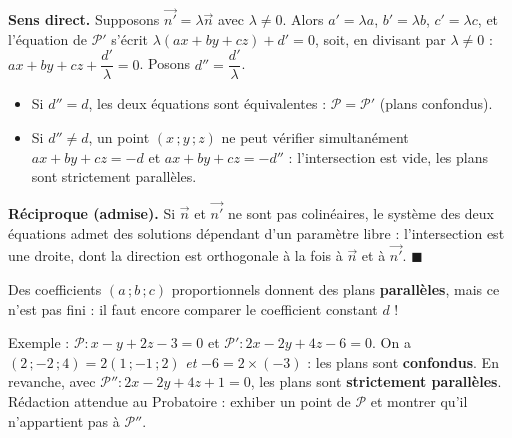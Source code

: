 \documentclass[11pt]{article}
\begin{document}
\begin{experience}
\textbf{Sens direct.} Supposons $\vec{n'} = \lambda \vec{n}$ avec $\lambda \neq 0$. Alors $a' = \lambda a$, $b' = \lambda b$, $c' = \lambda c$, et l'équation de $\mathcal{P}'$ s'écrit $\lambda(ax + by + cz) + d' = 0$, soit, en divisant par $\lambda \neq 0$ : $ax + by + cz + \dfrac{d'}{\lambda} = 0$. Posons $d'' = \dfrac{d'}{\lambda}$.
\begin{itemize}
\item Si $d'' = d$, les deux équations sont équivalentes : $\mathcal{P} = \mathcal{P}'$ (plans confondus).
\item Si $d'' \neq d$, un point $(x\,;y\,;z)$ ne peut vérifier simultanément $ax + by + cz = -d$ et $ax + by + cz = -d''$ : l'intersection est vide, les plans sont strictement parallèles.
\end{itemize}
\textbf{Réciproque (admise).} Si $\vec{n}$ et $\vec{n'}$ ne sont pas colinéaires, le système des deux équations admet des solutions dépendant d'un paramètre libre : l'intersection est une droite, dont la direction est orthogonale à la fois à $\vec{n}$ et à $\vec{n'}$. $\blacksquare$
\end{experience}

\begin{attention}
Des coefficients $(a\,;b\,;c)$ proportionnels donnent des plans \textbf{parallèles}, mais ce n'est pas fini : il faut encore comparer le coefficient constant $d$ !

Exemple : $\mathcal{P} : x - y + 2z - 3 = 0$ et $\mathcal{P}' : 2x - 2y + 4z - 6 = 0$. On a $(2\,;-2\,;4) = 2(1\,;-1\,;2)$ \emph{et} $-6 = 2 \times (-3)$ : les plans sont \textbf{confondus}. En revanche, avec $\mathcal{P}'' : 2x - 2y + 4z + 1 = 0$, les plans sont \textbf{strictement parallèles}. Rédaction attendue au Probatoire : exhiber un point de $\mathcal{P}$ et montrer qu'il n'appartient pas à $\mathcal{P}''$.
\end{attention}
\end{document}
